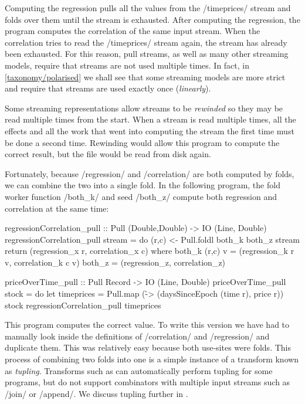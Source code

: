 Computing the regression pulls all the values from the \Hs/timeprices/ stream and folds over them until the stream is exhausted.
After computing the regression, the program computes the correlation of the same input stream.
When the correlation tries to read the \Hs/timeprices/ stream again, the stream has already been exhausted.
For this reason, pull streams, as well as many other streaming models, require that streams are not used multiple times.
In fact, in \cref{taxonomy/polarised} we shall see that some streaming models are more strict and require that streams are used exactly once (\emph{linearly}).

Some streaming representations allow streams to be \emph{rewinded} so they may be read multiple times from the start.
When a stream is read multiple times, all the effects and all the work that went into computing the stream the first time must be done a second time.
Rewinding would allow this program to compute the correct result, but the file would be read from disk again.

Fortunately, because \Hs/regression/ and \Hs/correlation/ are both computed by folds, we can combine the two into a single fold.
In the following program, the fold worker function \Hs/both_k/ and seed \Hs/both_z/ compute both regression and correlation at the same time:

\begin{haskell}
regressionCorrelation_pull :: Pull (Double,Double) -> IO (Line, Double)
regressionCorrelation_pull stream = do
  (r,c) <- Pull.foldl both_k both_z stream
  return (regression_x r, correlation_x c)
 where
  both_k (r,c) v = (regression_k r v, correlation_k c v)
  both_z         = (regression_z,     correlation_z)

priceOverTime_pull :: Pull Record -> IO (Line, Double)
priceOverTime_pull stock = do
  let timeprices = Pull.map (\r -> (daysSinceEpoch (time r), price r)) stock
  regressionCorrelation_pull timeprices
\end{haskell}

This program computes the correct value.
To write this version we have had to manually look inside the definitions of \Hs/correlation/ and \Hs/regression/ and duplicate them.
This was relatively easy because both use-sites were folds.
This process of combining two folds into one is a simple instance of a transform known as \emph{tupling}.
Transforms such as \cite{hu1997tupling,hu2005program,chiba2010program} can automatically perform tupling for some programs, but do not support combinators with multiple input streams such as \Hs/join/ or \Hs/append/.
We discuss tupling further in .


